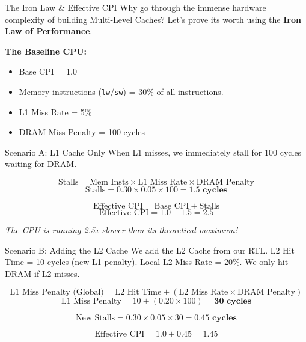 \documentclass[aspectratio=169]{beamer}
\begin{document}
\begin{frame}{The Iron Law \& Effective CPI}
Why go through the immense hardware complexity of building Multi-Level Caches? Let's prove its worth using the \textbf{Iron Law of Performance}.

\vspace{0.3cm}
\textbf{The Baseline CPU:}
\begin{itemize}
    \item Base CPI = 1.0
    \item Memory instructions (\texttt{lw}/\texttt{sw}) = 30\% of all instructions.
    \item L1 Miss Rate = 5\%
    \item DRAM Miss Penalty = 100 cycles
\end{itemize}
\end{frame}

\begin{frame}{Scenario A: L1 Cache Only}
When L1 misses, we immediately stall for 100 cycles waiting for DRAM.

\vspace{0.5cm}
\[ \text{Stalls} = \text{Mem Insts} \times \text{L1 Miss Rate} \times \text{DRAM Penalty} \]
\vspace{0.3cm}
\[ \text{Stalls} = 0.30 \times 0.05 \times 100 = \mathbf{1.5 \text{ cycles}} \]

\vspace{0.5cm}
\[ \text{Effective CPI} = \text{Base CPI} + \text{Stalls} \]
\[ \text{Effective CPI} = 1.0 + 1.5 = \mathbf{2.5} \]

\vspace{0.5cm}
\textit{The CPU is running 2.5x slower than its theoretical maximum!}
\end{frame}

\begin{frame}{Scenario B: Adding the L2 Cache}
We add the L2 Cache from our RTL. L2 Hit Time = 10 cycles (new L1 penalty). Local L2 Miss Rate = 20\%. We only hit DRAM if L2 misses.

\vspace{0.3cm}
\[ \text{L1 Miss Penalty (Global)} = \text{L2 Hit Time} + (\text{L2 Miss Rate} \times \text{DRAM Penalty}) \]
\[ \text{L1 Miss Penalty} = 10 + (0.20 \times 100) = \mathbf{30 \text{ cycles}} \]

\vspace{0.3cm}
\[ \text{New Stalls} = 0.30 \times 0.05 \times 30 = \mathbf{0.45 \text{ cycles}} \]

\vspace{0.3cm}
\[ \text{Effective CPI} = 1.0 + 0.45 = \mathbf{1.45} \]
\end{frame}
\end{document}
